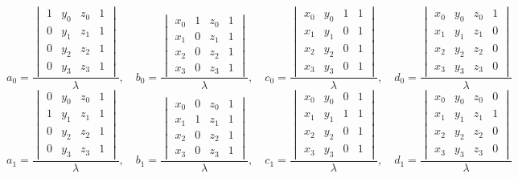 \documentclass[12pt,a4paper]{article}
\begin{document}
$$
a_0=\frac{\begin{vmatrix}
            1&y_0&z_0&1\\
            0&y_1&z_1&1\\
            0&y_2&z_2&1\\
            0&y_3&z_3&1
          \end{vmatrix}}{\lambda},\quad
b_0=\frac{\begin{vmatrix}
            x_0&1&z_0&1\\
            x_1&0&z_1&1\\
            x_2&0&z_2&1\\
            x_3&0&z_3&1
          \end{vmatrix}}{\lambda},\quad
c_0=\frac{\begin{vmatrix}
            x_0&y_0&1&1\\
            x_1&y_1&0&1\\
            x_2&y_2&0&1\\
            x_3&y_3&0&1
          \end{vmatrix}}{\lambda},\quad
d_0=\frac{\begin{vmatrix}
            x_0&y_0&z_0&1\\
            x_1&y_1&z_1&0\\
            x_2&y_2&z_2&0\\
            x_3&y_3&z_3&0
          \end{vmatrix}}{\lambda}          
$$
$$
a_1=\frac{\begin{vmatrix}
            0&y_0&z_0&1\\
            1&y_1&z_1&1\\
            0&y_2&z_2&1\\
            0&y_3&z_3&1
          \end{vmatrix}}{\lambda},\quad
b_1=\frac{\begin{vmatrix}
            x_0&0&z_0&1\\
            x_1&1&z_1&1\\
            x_2&0&z_2&1\\
            x_3&0&z_3&1
          \end{vmatrix}}{\lambda},\quad
c_1=\frac{\begin{vmatrix}
            x_0&y_0&0&1\\
            x_1&y_1&1&1\\
            x_2&y_2&0&1\\
            x_3&y_3&0&1
          \end{vmatrix}}{\lambda},\quad
d_1=\frac{\begin{vmatrix}
            x_0&y_0&z_0&0\\
            x_1&y_1&z_1&1\\
            x_2&y_2&z_2&0\\
            x_3&y_3&z_3&0
          \end{vmatrix}}{\lambda}          
$$
\end{document}
